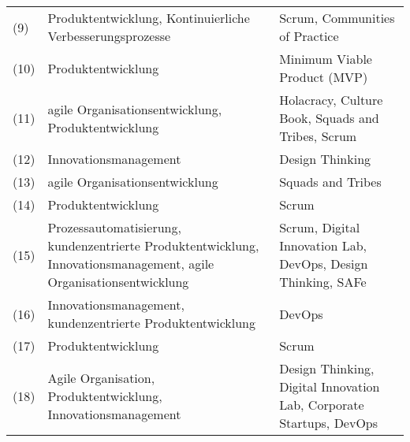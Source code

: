 \begin{sidewaystable}[ht]
\begin{tabular}{|l|p{8cm}|p{8cm}|}
		(9)           & Produktentwicklung, Kontinuierliche Verbesserungsprozesse                                                          & Scrum, Communities of Practice                                                                   \\
		(10)          & Produktentwicklung                                                                                                 & Minimum Viable Product (MVP)                                                                   \\
		(11) & agile Organisationsentwicklung, Produktentwicklung                                                                 & Holacracy, Culture Book, Squads and Tribes, Scrum                                                \\
		(12)                                & Innovationsmanagement                                                                                              & Design Thinking                                                                                  \\
		(13)                                & agile Organisationsentwicklung                                                                                     & Squads and Tribes                                                                                \\
		(14)          & Produktentwicklung                                                                                                 & Scrum                                                                                            \\
		(15)              & Prozessautomatisierung, kundenzentrierte Produktentwicklung, Innovationsmanagement, agile Organisationsentwicklung & Scrum, Digital Innovation Lab, DevOps, Design Thinking, SAFe                                     \\
		(16)                            & Innovationsmanagement, kundenzentrierte Produktentwicklung                                                         & DevOps                                                                                           \\
		(17)                              & Produktentwicklung                                                                                                 & Scrum                                                                                            \\
		(18)                               & Agile Organisation, Produktentwicklung, Innovationsmanagement                                                      & Design Thinking, Digital Innovation Lab, Corporate Startups, DevOps                              \\

\end{tabular}
\end{sidewaystable}

